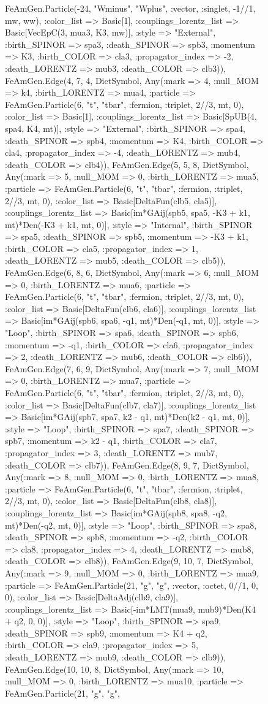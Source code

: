 \documentclass{revtex4}
\begin{document}
\begin{figure}[!htb]
\begin{center}
{FeAmGen.Particle(-24, "Wminus", "Wplus", :vector, :singlet, -1//1, mw, ww), :color_list => Basic[1], :couplings_lorentz_list => Basic[VecEpC(3, mua3, K3, mw)], :style => "External", :birth_SPINOR => spa3, :death_SPINOR => spb3, :momentum => K3, :birth_COLOR => cla3, :propagator_index => -2, :death_LORENTZ => mub3, :death_COLOR => clb3)), FeAmGen.Edge(4, 7, 4, Dict{Symbol, Any}(:mark => 4, :null_MOM => k4, :birth_LORENTZ => mua4, :particle => FeAmGen.Particle(6, "t", "tbar", :fermion, :triplet, 2//3, mt, 0), :color_list => Basic[1], :couplings_lorentz_list => Basic[SpUB(4, spa4, K4, mt)], :style => "External", :birth_SPINOR => spa4, :death_SPINOR => spb4, :momentum => K4, :birth_COLOR => cla4, :propagator_index => -4, :death_LORENTZ => mub4, :death_COLOR => clb4)), FeAmGen.Edge(5, 5, 8, Dict{Symbol, Any}(:mark => 5, :null_MOM => 0, :birth_LORENTZ => mua5, :particle => FeAmGen.Particle(6, "t", "tbar", :fermion, :triplet, 2//3, mt, 0), :color_list => Basic[DeltaFun(clb5, cla5)], :couplings_lorentz_list => Basic[im*GAij(spb5, spa5, -K3 + k1, mt)*Den(-K3 + k1, mt, 0)], :style => "Internal", :birth_SPINOR => spa5, :death_SPINOR => spb5, :momentum => -K3 + k1, :birth_COLOR => cla5, :propagator_index => 1, :death_LORENTZ => mub5, :death_COLOR => clb5)), FeAmGen.Edge(6, 8, 6, Dict{Symbol, Any}(:mark => 6, :null_MOM => 0, :birth_LORENTZ => mua6, :particle => FeAmGen.Particle(6, "t", "tbar", :fermion, :triplet, 2//3, mt, 0), :color_list => Basic[DeltaFun(clb6, cla6)], :couplings_lorentz_list => Basic[im*GAij(spb6, spa6, -q1, mt)*Den(-q1, mt, 0)], :style => "Loop", :birth_SPINOR => spa6, :death_SPINOR => spb6, :momentum => -q1, :birth_COLOR => cla6, :propagator_index => 2, :death_LORENTZ => mub6, :death_COLOR => clb6)), FeAmGen.Edge(7, 6, 9, Dict{Symbol, Any}(:mark => 7, :null_MOM => 0, :birth_LORENTZ => mua7, :particle => FeAmGen.Particle(6, "t", "tbar", :fermion, :triplet, 2//3, mt, 0), :color_list => Basic[DeltaFun(clb7, cla7)], :couplings_lorentz_list => Basic[im*GAij(spb7, spa7, k2 - q1, mt)*Den(k2 - q1, mt, 0)], :style => "Loop", :birth_SPINOR => spa7, :death_SPINOR => spb7, :momentum => k2 - q1, :birth_COLOR => cla7, :propagator_index => 3, :death_LORENTZ => mub7, :death_COLOR => clb7)), FeAmGen.Edge(8, 9, 7, Dict{Symbol, Any}(:mark => 8, :null_MOM => 0, :birth_LORENTZ => mua8, :particle => FeAmGen.Particle(6, "t", "tbar", :fermion, :triplet, 2//3, mt, 0), :color_list => Basic[DeltaFun(clb8, cla8)], :couplings_lorentz_list => Basic[im*GAij(spb8, spa8, -q2, mt)*Den(-q2, mt, 0)], :style => "Loop", :birth_SPINOR => spa8, :death_SPINOR => spb8, :momentum => -q2, :birth_COLOR => cla8, :propagator_index => 4, :death_LORENTZ => mub8, :death_COLOR => clb8)), FeAmGen.Edge(9, 10, 7, Dict{Symbol, Any}(:mark => 9, :null_MOM => 0, :birth_LORENTZ => mua9, :particle => FeAmGen.Particle(21, "g", "g", :vector, :octet, 0//1, 0, 0), :color_list => Basic[DeltaAdj(clb9, cla9)], :couplings_lorentz_list => Basic[-im*LMT(mua9, mub9)*Den(K4 + q2, 0, 0)], :style => "Loop", :birth_SPINOR => spa9, :death_SPINOR => spb9, :momentum => K4 + q2, :birth_COLOR => cla9, :propagator_index => 5, :death_LORENTZ => mub9, :death_COLOR => clb9)), FeAmGen.Edge(10, 10, 8, Dict{Symbol, Any}(:mark => 10, :null_MOM => 0, :birth_LORENTZ => mua10, :particle => FeAmGen.Particle(21, "g", "g", }
\end{center}
\end{figure}
\end{document}
